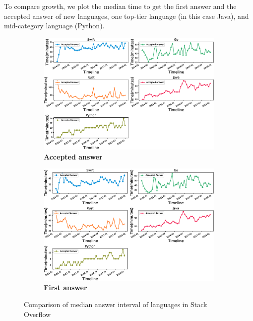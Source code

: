 To compare growth, we plot the median time to get the first answer and the accepted answer of new languages, one top-tier language (in this case Java), and mid-category language (Python).
\begin{figure}[htbp]
\begin{subfigure}{0.6\textwidth}
\centering
\hspace{-3cm}
\includegraphics[scale=0.38]{figures/AcceptedAnswerInterval.eps}
\caption{\textbf{Accepted answer}}
\label{fig:Accepted Answer interval}
\end{subfigure}
\begin{subfigure}{0.6\textwidth}
\centering
\hspace{-3cm}
\includegraphics[scale=0.38]{figures/FirstAnswerInterval.eps}
\caption{\textbf{First answer}}
\label{fig:First Answer interval}
\end{subfigure}
\caption{Comparison of median answer interval  of languages in Stack Overflow}
\label{fig:Answer intervals}
\end{figure}
